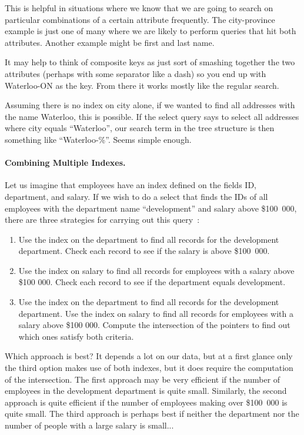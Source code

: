 \documentclass[a4paper]{report}
\begin{document}
This is helpful in situations where we know that we are going to search on particular combinations of a certain attribute frequently. The city-province example is just one of many where we are likely to perform queries that hit both attributes. Another example might be first and last name.

It may help to think of composite keys as just sort of smashing together the two attributes (perhaps with some separator like a dash) so you end up with Waterloo-ON as the key. From there it works mostly like the regular search. 

Assuming there is no index on city alone, if we wanted to find all addresses with the name Waterloo, this is possible. If the select query says to select all addresses where city equals ``Waterloo'', our search term in the tree structure is then something like ``Waterloo-\%''. Seems simple enough. 


\paragraph{Combining Multiple Indexes.} Let us imagine that employees have an index defined on the fields ID, department, and salary. If we wish to do a select that finds the IDs of all employees with the department name ``development'' and salary above \$100~000, there are three strategies for carrying out this query~\cite{dsc}:

\begin{enumerate}
	\item Use the index on the department to find all records for the development department. Check each record to see if the salary is above \$100~000.
	\item Use the index on salary to find all records for employees with a salary above \$100 000. Check each record to see if the department equals development.
	\item Use the index on the department to find all records for the development department. Use the index on salary to find all records for employees with a salary above \$100 000. Compute the intersection of the pointers to find out which ones satisfy both criteria.
\end{enumerate}

Which approach is best? It depends a lot on our data, but at a first glance only the third option makes use of both indexes, but it does require the computation of the intersection. The first approach may be very efficient if the number of employees in the development department is quite small. Similarly, the second approach is quite efficient if the number of employees making over \$100~000 is quite small. The third approach is perhaps best if neither the department nor the number of people with a large salary is small...
\end{document}
